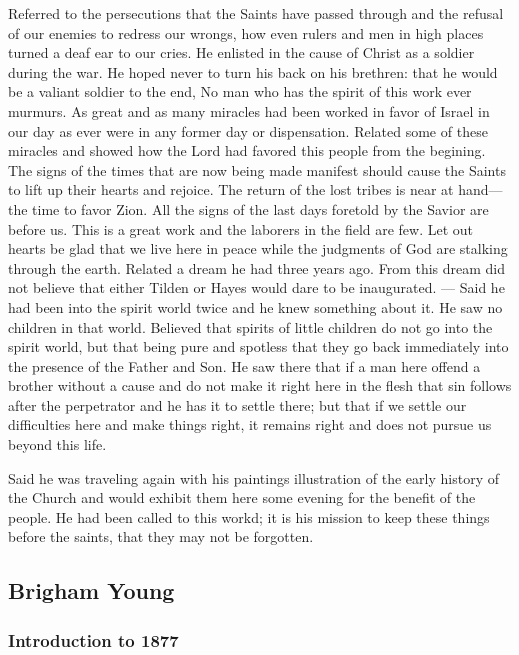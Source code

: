 					Referred to the persecutions that the Saints have passed through and the refusal of our enemies to redress our wrongs, how even rulers and men in high places turned a deaf ear to our cries. He enlisted in the cause of Christ as a soldier during the war. He hoped never to turn his back on his brethren: that he would be a valiant soldier to the end, No man who has the spirit of this work ever murmurs. As great and as many miracles had been worked in favor of Israel in our day as ever were in any former day or dispensation. Related some of these miracles and showed how the Lord had favored this people from the begining.
					The signs of the times that are now being made manifest should cause the Saints to lift up their hearts and rejoice. The return of the lost tribes is near at hand---the time to favor Zion. All the signs of the last days foretold by the Savior are before us. This is a great work and the laborers in the field are few. Let out hearts be glad that we live here in peace while the judgments of God are stalking through the earth. Related a dream he had three years ago. From this dream did not believe that either Tilden or Hayes would dare to be inaugurated. --- Said he had been into the spirit world twice and he knew something about it. He saw no children in that world. Believed that spirits of little children do not go into the spirit world, but that being pure and spotless that they go back immediately into the presence of the Father and Son. He saw there that if a man here offend a brother without a cause and do not make it right here in the flesh that sin follows after the perpetrator and he has it to settle there; but that if we settle our difficulties here and make things right, it remains right and does not pursue us beyond this life.
					
					Said he was traveling again with his paintings illustration of the early history of the Church and would exhibit them here some evening for the benefit of the people. He had been called to this workd; it is his mission to keep these things before the saints, that they may not be forgotten. 

	\subsection{Brigham Young}
		\label{EMS-1877-BY}

		\subsubsection{Introduction to 1877}
		
